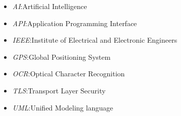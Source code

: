 \begin{itemize}
	\item \textit{AI}:\@ Artificial Intelligence
	\item \textit{API}:\@ Application Programming Interface
	\item \textit{IEEE}:\@ Institute of Electrical and Electronic Engineers
	\item \textit{GPS}:\@ Global Positioning System
	\item \textit{OCR}:\@ Optical Character Recognition
	\item \textit{TLS}:\@ Transport Layer Security
	\item \textit{UML}:\@ Unified Modeling language
\end{itemize}